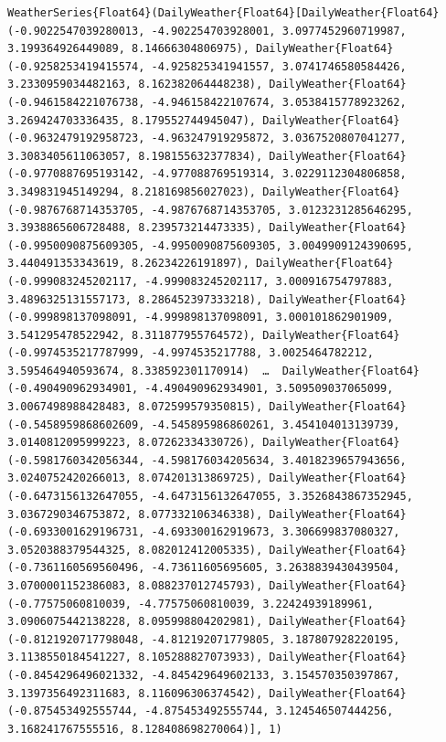 \begin{verbatim}
WeatherSeries{Float64}(DailyWeather{Float64}[DailyWeather{Float64}(-0.9022547039280013, -4.902254703928001, 3.0977452960719987, 3.199364926449089, 8.14666304806975), DailyWeather{Float64}(-0.9258253419415574, -4.925825341941557, 3.0741746580584426, 3.2330959034482163, 8.162382064448238), DailyWeather{Float64}(-0.9461584221076738, -4.946158422107674, 3.0538415778923262, 3.269424703336435, 8.179552744945047), DailyWeather{Float64}(-0.9632479192958723, -4.963247919295872, 3.0367520807041277, 3.3083405611063057, 8.198155632377834), DailyWeather{Float64}(-0.9770887695193142, -4.977088769519314, 3.0229112304806858, 3.349831945149294, 8.218169856027023), DailyWeather{Float64}(-0.9876768714353705, -4.9876768714353705, 3.0123231285646295, 3.3938865606728488, 8.239573214473335), DailyWeather{Float64}(-0.9950090875609305, -4.9950090875609305, 3.0049909124390695, 3.440491353343619, 8.26234226191897), DailyWeather{Float64}(-0.999083245202117, -4.999083245202117, 3.000916754797883, 3.4896325131557173, 8.286452397333218), DailyWeather{Float64}(-0.999898137098091, -4.999898137098091, 3.000101862901909, 3.541295478522942, 8.311877955764572), DailyWeather{Float64}(-0.9974535217787999, -4.9974535217788, 3.0025464782212, 3.595464940593674, 8.338592301170914)  …  DailyWeather{Float64}(-0.490490962934901, -4.490490962934901, 3.509509037065099, 3.0067498988428483, 8.072599579350815), DailyWeather{Float64}(-0.5458959868602609, -4.545895986860261, 3.454104013139739, 3.0140812095999223, 8.07262334330726), DailyWeather{Float64}(-0.5981760342056344, -4.598176034205634, 3.4018239657943656, 3.0240752420266013, 8.074201313869725), DailyWeather{Float64}(-0.6473156132647055, -4.6473156132647055, 3.3526843867352945, 3.0367290346753872, 8.077332106346338), DailyWeather{Float64}(-0.6933001629196731, -4.693300162919673, 3.306699837080327, 3.0520388379544325, 8.082012412005335), DailyWeather{Float64}(-0.7361160569560496, -4.73611605695605, 3.2638839430439504, 3.0700001152386083, 8.088237012745793), DailyWeather{Float64}(-0.77575060810039, -4.77575060810039, 3.22424939189961, 3.0906075442138228, 8.095998804202981), DailyWeather{Float64}(-0.8121920717798048, -4.812192071779805, 3.187807928220195, 3.1138550184541227, 8.105288827073933), DailyWeather{Float64}(-0.8454296496021332, -4.845429649602133, 3.154570350397867, 3.1397356492311683, 8.116096306374542), DailyWeather{Float64}(-0.875453492555744, -4.875453492555744, 3.124546507444256, 3.168241767555516, 8.128408698270064)], 1)
\end{verbatim}



